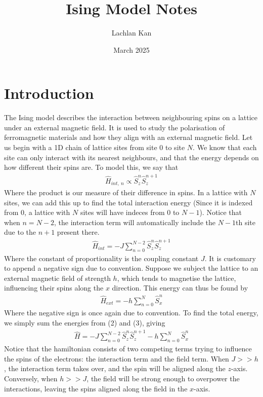 \documentclass{article}
\title{Ising Model Notes}
\author{Lachlan Kan}
\date{March 2025}
\begin{document}
\maketitle
\section{Introduction}
The Ising model describes the interaction between neighbouring spins on a lattice
under an external magnetic field. It is used to study the polarisation of ferromagnetic 
materials and how they align with an external magnetic field. Let us begin with 
a 1D chain of lattice sites from site 0 to site $N$. We know that each site can only interact with its nearest neighbours, and that 
the energy depends on how different their spins are. To model this, we say that 
\begin{align}
    \hat{H}_{int,\ n}\propto\hat{S}_z^n \hat{S}_z^{n+1}
\end{align}
Where the product is our measure of their difference in spins.
 In a lattice with $N$ sites, we can add this up to find 
the total interaction energy (Since it is indexed from 0, a lattice with $N$ sites 
will have indeces from $0$ to $N-1$). 
Notice that when $n=N-2$, the interaction term will automatically include the $N-1$th site due to 
the $n+1$ present there. 
\begin{align}
    \hat{H}_{int}=-J\sum_{n=0}^{N-2}\hat{S}_z^n \hat{S}_z^{n+1}
\end{align}
Where the constant of proportionality is the coupling constant $J$. It is customary to append a negative sign due to convention. 
Suppose we subject the lattice to an external magnetic field of strength $h$, which tends to 
magnetise the lattice, influencing their spins along the $x$ direction. This energy can thus be 
found by 
\begin{align}
    \hat{H}_{ext}=-h\sum_{n=0}^N\hat{S}_x^n
\end{align}
Where the negative sign is once again due to convention. 
To find the total energy, we simply sum the energies from (2) and (3), giving 
\begin{align}
    \hat{H}=-J\sum_{n=0}^{N-2}\hat{S}_z^n \hat{S}_z^{n+1}-h\sum_{n=0}^N\hat{S}_x^n
\end{align}
Notice that the hamiltonian consists of two competing terms trying to influence the spins of the electrons: the interaction term and the field term. 
When $J>>h$, the interaction term takes over, 
and the spin will be aligned along the $z$-axis. Conversely, when 
$h>>J$, the field will be strong enough to overpower the interactions, 
leaving the spins aligned 
along the field in the $x$-axis. 
\end{document}

